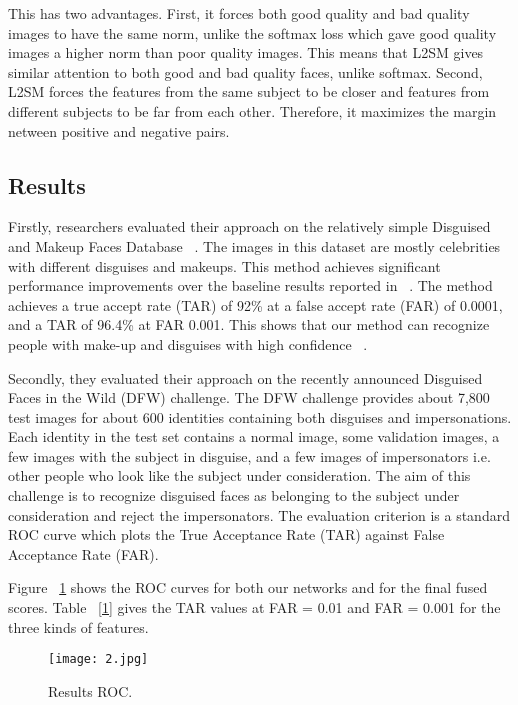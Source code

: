 \documentclass[10pt,twocolumn,letterpaper]{article}
\begin{document}
This has two advantages. First, it forces both good quality and bad quality images to have the same norm, unlike the softmax loss which gave good quality images a higher norm than poor quality images. This means that L2SM gives similar attention to both good and bad quality faces, unlike softmax. Second, L2SM forces the features from the same subject to be closer and features from different subjects to be far from each other. Therefore, it maximizes the margin netween positive and negative pairs.

\subsection{Results}

Firstly, researchers evaluated their approach on the relatively simple Disguised and Makeup Faces Database ~\cite{wang2016recognizing}. The images in this dataset are mostly celebrities with different disguises and makeups. This method achieves significant performance improvements over the baseline results reported in ~\cite{wang2016recognizing}. The method achieves a true accept rate (TAR) of 92\% at a false accept rate (FAR) of 0.0001, and a TAR of 96.4\% at FAR 0.001. This shows that our method can recognize people with make-up and disguises with high confidence ~\cite{bansal2018deep}.

Secondly, they evaluated their approach on the recently announced Disguised Faces in the Wild (DFW) challenge. The DFW challenge provides about 7,800 test images for about 600 identities containing both disguises and impersonations. Each identity in the test set contains a normal image, some validation images, a few images with the subject in disguise, and a few images of impersonators i.e. other people who look like the subject under consideration. The aim of this challenge is to recognize disguised faces as belonging to the subject under consideration and reject the impersonators. The evaluation criterion is a standard ROC curve which plots the True Acceptance Rate (TAR) against False Acceptance Rate (FAR).

Figure ~\ref{fig:twocol} shows the ROC curves for both our networks and for the final fused scores. Table ~\ref{1} gives the TAR values at FAR = 0.01 and FAR = 0.001 for the three kinds of features.

\begin{figure}[!htpb]
\begin{center}
   \texttt{[image: 2.jpg]}
\end{center}
   \caption{Results ROC.}
\label{fig:twocol}
\end{figure}
\end{document}
